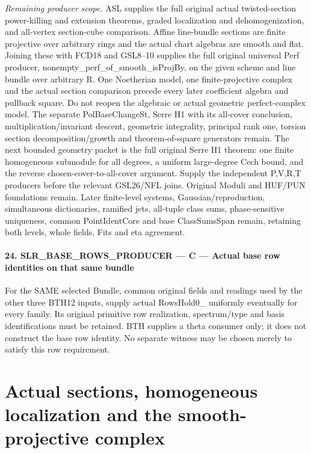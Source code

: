 \documentclass[11pt,a4paper]{article}
\numberwithin{equation}{section}
\theoremstyle{remark}\newtheorem{remark}[theorem]{Remark}
\begin{document}
\emph{Remaining producer scope.} ASL supplies the full original actual twisted-section power-killing and extension theorems, graded localization and dehomogenization, and all-vertex section-cube comparison. Affine line-bundle sections are finite projective over arbitrary rings and the actual chart algebras are smooth and flat. Joining these with FCD18 and GSL8–10 supplies the full original universal Perf producer, nonempty\_\allowbreak perf\_\allowbreak of\_\allowbreak smooth\_\allowbreak isProjBy, on the given scheme and line bundle over arbitrary R. One Noetherian model, one finite-projective complex and the actual section comparison precede every later coefficient algebra and pullback square. Do not reopen the algebraic or actual geometric perfect-complex model. The separate PolBaseChangeSt, Serre H1 with its all-cover conclusion, multiplication/invariant descent, geometric integrality, principal rank one, torsion section decomposition/growth and theorem-of-square generators remain. The next bounded geometry packet is the full original Serre H1 theorem: one finite homogeneous submodule for all degrees, a uniform large-degree Cech bound, and the reverse chosen-cover-to-all-cover argument. Supply the independent P,V,R,T producers before the relevant GSL26/NFL joins. Original Moduli and HUF/PUN foundations remain. Later finite-level systems, Gaussian/reproduction, simultaneous dictionaries, ramified jets, all-tuple class sums, phase-sensitive uniqueness, common PointIdentCore and base ClassSumsSpan remain, retaining both levels, whole fields, Fits and eta agreement.



\paragraph{24. SLR\_\allowbreak BASE\_\allowbreak ROWS\_\allowbreak PRODUCER — C — Actual base row identities on that same bundle}

For the SAME selected Bundle, common original fields and readings used by the other three BTH12 inputs, supply actual RowsHold0\_ uniformly eventually for every family. Its original primitive row realization, spectrum/type and basis identifications must be retained. BTH supplies a theta consumer only; it does not construct the base row identity. No separate witness may be chosen merely to satisfy this row requirement.



\clearpage
\section{Actual sections, homogeneous localization and the smooth-projective complex}
\label{sec:actual-section-localization-v054}
\end{document}
